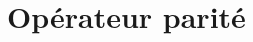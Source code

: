 \documentclass[../notesdecours.tex]{subfiles}
\begin{document}







\section{Opérateur parité}
\end{document}
